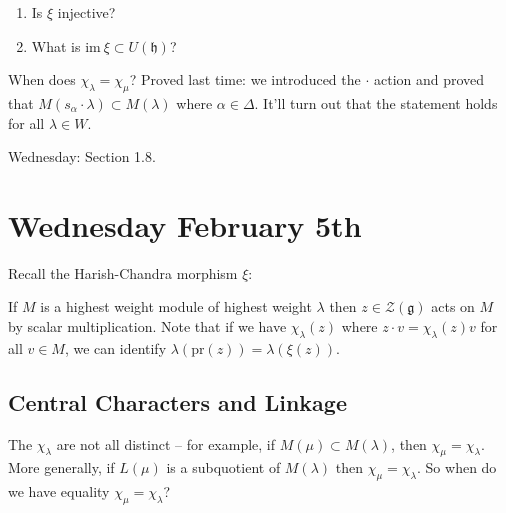 \documentclass[11pt]{scrartcl}
\theoremstyle{definition}
\theoremstyle{theorem}
\theoremstyle{proof}
\theoremstyle{definition}
\theoremstyle{break}
\theoremstyle{problem}
\providecommand{\tightlist}{%
  \setlength{\itemsep}{0pt}\setlength{\parskip}{0pt}}
\newcommand{\im}[0]{{\text{im}~}}
\newcommand{\lieg}[0]{{\mathfrak{g}}}
\newcommand{\lieh}[0]{{\mathfrak{h}}}
\newcommand{\lien}[0]{{\mathfrak{n}}}
\newcommand{\mcz}[0]{{\mathcal{Z}}}
\begin{document}
\begin{enumerate}
\def\labelenumi{\arabic{enumi}.}
\tightlist
\item
  Is \(\xi\) injective?
\item
  What is \(\im \xi \subset U(\lieh)\)?
\end{enumerate}

When does \(\chi_\lambda = \chi_\mu\)? Proved last time: we introduced
the \(\cdot\) action and proved that
\(M(s_\alpha \cdot \lambda) \subset M(\lambda)\) where
\(\alpha \in \Delta\). It'll turn out that the statement holds for all
\(\lambda \in W\).

Wednesday: Section 1.8.

\hypertarget{wednesday-february-5th}{%
\section{Wednesday February 5th}\label{wednesday-february-5th}}

Recall the Harish-Chandra morphism \(\xi\):

\begin{center}
\end{center}

If \(M\) is a highest weight module of highest weight \(\lambda\) then
\(z\in \mcz(\lieg)\) acts on \(M\) by scalar multiplication. Note that
if we have \(\chi_\lambda(z)\) where \(z\cdot v = \chi_\lambda(z) v\)
for all \(v\in M\), we can identify
\(\lambda(\mathrm{pr}(z)) = \lambda(\xi(z))\).

\hypertarget{central-characters-and-linkage}{%
\subsection{Central Characters and
Linkage}\label{central-characters-and-linkage}}

The \(\chi_\lambda\) are not all distinct -- for example, if
\(M(\mu) \subset M(\lambda)\), then \(\chi_\mu = \chi_\lambda\). More
generally, if \(L(\mu)\) is a subquotient of \(M(\lambda)\) then
\(\chi_\mu = \chi_\lambda\). So when do we have equality
\(\chi_\mu = \chi_\lambda\)?
\end{document}
